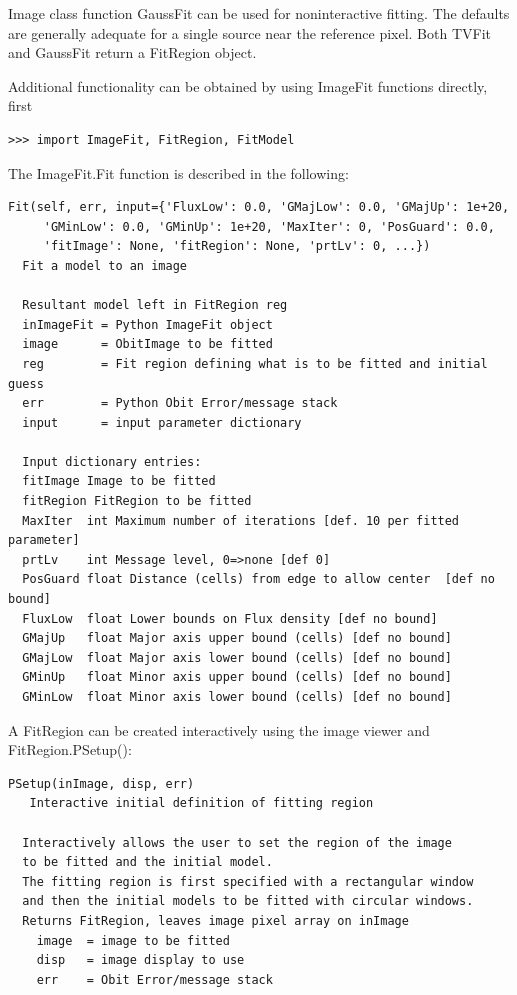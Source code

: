\documentclass[11pt]{report}
\begin{document}
Image class function GaussFit can be used for noninteractive fitting.
The defaults are generally adequate for a single source near the
reference pixel.  
Both TVFit and GaussFit return a FitRegion object.

Additional functionality can be obtained by using ImageFit functions directly, first 
\begin{verbatim}
>>> import ImageFit, FitRegion, FitModel
\end{verbatim}
The ImageFit.Fit function is described in the following:
\begin{verbatim}
Fit(self, err, input={'FluxLow': 0.0, 'GMajLow': 0.0, 'GMajUp': 1e+20, 
     'GMinLow': 0.0, 'GMinUp': 1e+20, 'MaxIter': 0, 'PosGuard': 0.0, 
     'fitImage': None, 'fitRegion': None, 'prtLv': 0, ...})
  Fit a model to an image
 
  Resultant model left in FitRegion reg
  inImageFit = Python ImageFit object
  image      = ObitImage to be fitted
  reg        = Fit region defining what is to be fitted and initial guess
  err        = Python Obit Error/message stack
  input      = input parameter dictionary
 
  Input dictionary entries:
  fitImage Image to be fitted
  fitRegion FitRegion to be fitted
  MaxIter  int Maximum number of iterations [def. 10 per fitted parameter]
  prtLv    int Message level, 0=>none [def 0]
  PosGuard float Distance (cells) from edge to allow center  [def no bound]
  FluxLow  float Lower bounds on Flux density [def no bound]
  GMajUp   float Major axis upper bound (cells) [def no bound]
  GMajLow  float Major axis lower bound (cells) [def no bound]
  GMinUp   float Minor axis upper bound (cells) [def no bound]
  GMinLow  float Minor axis lower bound (cells) [def no bound]
\end{verbatim}

A FitRegion can be created interactively using the image viewer and
FitRegion.PSetup():
\begin{verbatim}
PSetup(inImage, disp, err)
   Interactive initial definition of fitting region
        
  Interactively allows the user to set the region of the image
  to be fitted and the initial model.
  The fitting region is first specified with a rectangular window
  and then the initial models to be fitted with circular windows.
  Returns FitRegion, leaves image pixel array on inImage
    image  = image to be fitted
    disp   = image display to use
    err    = Obit Error/message stack

\end{verbatim}
\end{document}
